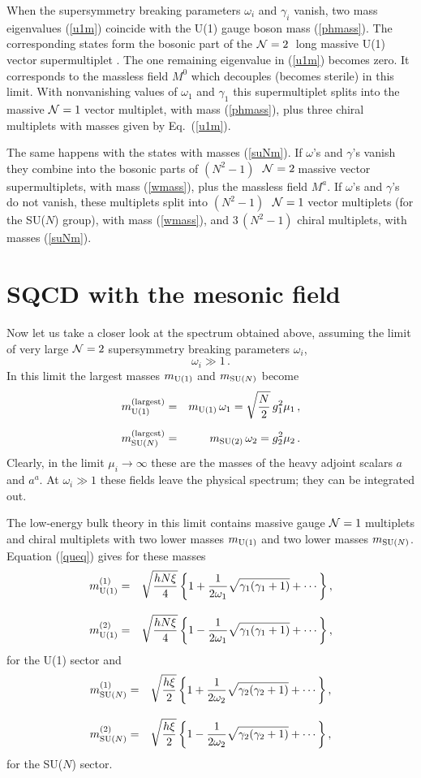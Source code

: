 \documentclass[epsfig,12pt]{article}
\def\beqn{\begin{eqnarray}}
\def\eeqn{\end{eqnarray}}
\newcommand{\ntwo}{${\cal N}=2\;$}
\newcommand{\none}{${\cal N}=1\;$}
\begin{document}
When the supersymmetry breaking parameters $\omega_{i}$ and $\gamma_i$ vanish, two mass eigenvalues (\ref{u1m}) coincide with the U(1) gauge
boson mass (\ref{phmass}). The corresponding states form
the  bosonic part of the \ntwo
long massive U(1) vector supermultiplet \cite{VY}. The one remaining eigenvalue 
in (\ref{u1m}) becomes zero.
It corresponds to the massless field $M^0$ which decouples (becomes sterile)
in this limit.  With nonvanishing values of 
$\omega_1$ and $\gamma_1$ this supermultiplet splits into
the  massive \none vector  multiplet,
with mass (\ref{phmass}), plus three chiral multiplets with masses given by
Eq.~(\ref{u1m}). 

The same happens with the  states with masses
(\ref{suNm}).  If $\omega$'s and $\gamma$'s vanish they combine
into the bosonic parts of $(N^2-1)\;$  \ntwo massive vector supermultiplets,
with mass
(\ref{wmass}), plus the massless field $M^a$. 
If  $\omega$'s and $\gamma$'s do not vanish, these multiplets split into $(N^2-1)\;$
 \none vector multiplets (for the SU($N$) group), with mass (\ref{wmass}),
and $3\,(N^2-1)$ chiral multiplets, with masses (\ref{suNm}).



\section{\boldmath{\none} SQCD with the mesonic  field}
\label{mtheory}
\setcounter{equation}{0}



Now let us take a closer look at the spectrum obtained above,
assuming the limit
of very large \ntwo supersymmetry breaking parameters $\omega_i$, 
$$
\omega_i\gg 1\,.
$$
In this limit the largest  masses $m_{{\rm U}(1)}$ and $m_{{\rm SU}(N)}$ become
\beqn
m_{{\rm U}(1)}^{\rm (largest)} &=&
 m_{{\rm U}(1)}\,\omega_1=\sqrt{\frac{N}{2}}\,g_1^2\mu_1\,,\nonumber\\[2mm]
m_{{\rm SU}(N)}^{\rm (largest)} &=& m_{{\rm SU}(2)}\,\omega_2=g_2^2\mu_2\, .
\label{amass}
\eeqn
Clearly, in the limit $\mu_i\to \infty$ these are
the masses of the heavy adjoint
scalars $a$ and $a^a$. At $\omega_i\gg 1$ these fields leave the physical
spectrum; they
can be integrated out.

The low-energy bulk theory in this limit
contains massive gauge  \none multiplets and chiral multiplets with
two lower masses $m_{{\rm U}(1)}$ and two lower masses $m_{{\rm SU}(N)}$.
 Equation (\ref{queq}) gives for these masses
\beqn
m_{{\rm U}(1)}^{(1)} &=&\sqrt{\frac{hN\xi}{4}}\left\{1+\frac1{2\omega_1}
\sqrt{\gamma_1(\gamma_1+1)}
+\cdots\right\},
\nonumber\\[3mm]
m_{{\rm U}(1)}^{(2)} &=&  \sqrt{\frac{hN\xi}{4}}\left\{1-\frac1{2\omega_1}
\sqrt{\gamma_1(\gamma_1+1)}
+\cdots\right\}, 
\label{U1mass}
\eeqn
for the U(1) sector and 
\beqn
m_{{\rm SU}(N)}^{(1)} &=& \sqrt{\frac{h\xi}{2}}\left\{1+\frac1{2\omega_2}
\sqrt{\gamma_2(\gamma_2+1)}
+\cdots\right\},
\nonumber\\[3mm]
m_{{\rm SU}(N)}^{(2)} &=&  \sqrt{\frac{h\xi}{2}}\left\{1-\frac1{2\omega_2}
\sqrt{\gamma_2(\gamma_2+1)}
+\cdots\right\},
\label{SUNmass}
\eeqn
for the SU($N$) sector.
\end{document}

